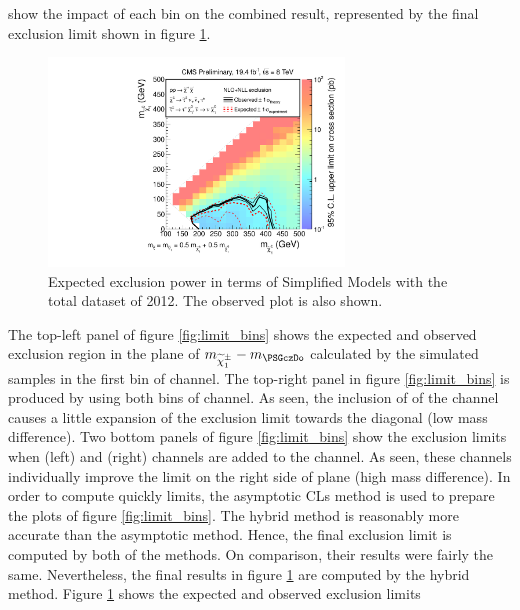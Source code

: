  show the impact of each bin on the combined result, represented by the final exclusion limit shown in figure \ref{fig:limit_final}. 
\begin{linenomath}
\begin{figure}[h]
\centering
\includegraphics[width=0.7\textwidth,keepaspectratio=true]{StatisticsFig/Exclusion4Bins.pdf}
\caption{Expected exclusion power in terms of Simplified Models
with the total dataset of 2012. The observed plot is also shown.
}
\label{fig:limit_final}
\end{figure}
\end{linenomath}
The top-left panel of figure \ref{fig:limit_bins} shows the expected and observed exclusion region in the plane of $m_{\chione}-m_{\PSGczDo}$
calculated by the simulated samples in the first bin of \tauTau channel. The top-right panel in figure \ref{fig:limit_bins} 
is produced by using both bins of \tauTau channel.
As seen, the inclusion of \bintwo of the \tauTau channel causes a little expansion of the exclusion limit towards 
the diagonal (low mass difference).
Two bottom panels of figure \ref{fig:limit_bins} show the exclusion limits when \eTau (left) and \muTau (right) channels are 
added to the \tauTau channel.  As seen, these channels individually improve the limit on the right side of plane (high mass difference).
In order to compute quickly limits, the asymptotic CLs method is used to prepare the plots of figure \ref{fig:limit_bins}.
The hybrid method is reasonably more accurate than the asymptotic method. Hence, the final exclusion limit is computed by both of the methods.
On comparison, their results were fairly the same. 
Nevertheless, the final results in figure \ref{fig:limit_final} are computed by the hybrid method.
Figure \ref{fig:limit_final} shows the expected and observed exclusion limits 
